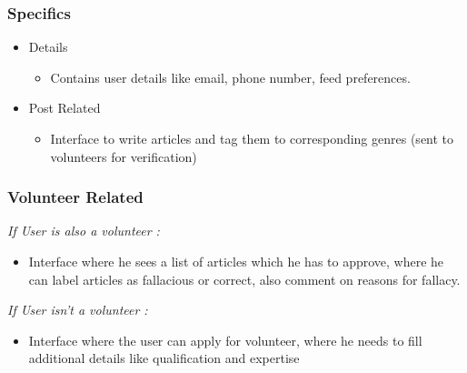 \documentclass[titlepage,12pt]{article}
\begin{document}
\subsubsection{Specifics}
\begin{itemize}
    \setlength\itemsep{0.3em}
    \item Details 
            \begin{itemize}
            \item Contains user details like email, phone number, feed preferences.
            \end{itemize}
    \item Post Related 
        \textit{ }
            \begin{itemize}
            \setlength\itemsep{0.3em}
            \item Interface to write articles and tag them to corresponding genres (sent to volunteers for verification)
            
            
            \end{itemize}
\end{itemize}
\subsubsection{ Volunteer Related }
        \noindent
        \textit{ If User is also a volunteer : }
        \begin{itemize}
             \setlength\itemsep{0.3em}
            \item Interface where he sees a list of articles which he has to approve, where he can label articles as fallacious or correct, also comment on reasons for fallacy.
        \end{itemize}
        \noindent
        \noindent
        \textit{ If User isn't a volunteer : }
        \begin{itemize}
             \setlength\itemsep{0.3em}
            \item Interface where the user can apply for volunteer, where he needs to fill additional details like qualification and expertise
        \end{itemize}
\end{document}
